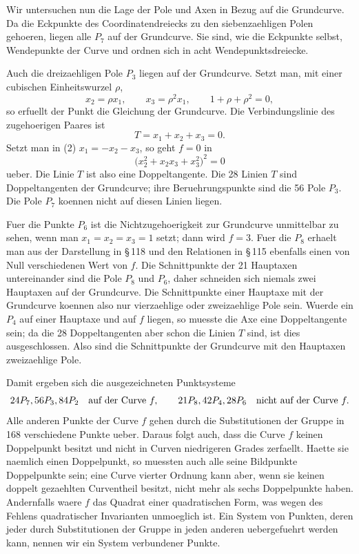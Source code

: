 \documentclass[11pt]{article}
\begin{document}
Wir untersuchen nun die Lage der Pole und Axen in Bezug auf die Grundcurve. Da die Eckpunkte des Coordinatendreiecks zu den siebenzaehligen Polen gehoeren, liegen alle \(P_7\) auf der Grundcurve. Sie sind, wie die Eckpunkte selbst, Wendepunkte der Curve und ordnen sich in acht Wendepunktsdreiecke.

Auch die dreizaehligen Pole \(P_3\) liegen auf der Grundcurve. Setzt man, mit einer cubischen Einheitswurzel \(\rho\),
\begin{equation}
x_2=\rho x_1,
\qquad
x_3=\rho^2x_1,
\qquad
1+\rho+\rho^2=0,
\end{equation}
so erfuellt der Punkt die Gleichung der Grundcurve. Die Verbindungslinie des zugehoerigen Paares ist
\begin{equation}
T=x_1+x_2+x_3=0.
\end{equation}
Setzt man in (2) \(x_1=-x_2-x_3\), so geht \(f=0\) in
\begin{equation}
\bigl(x_2^2+x_2x_3+x_3^2\bigr)^2=0
\end{equation}
ueber. Die Linie \(T\) ist also eine Doppeltangente. Die 28 Linien \(T\) sind Doppeltangenten der Grundcurve; ihre Beruehrungspunkte sind die 56 Pole \(P_3\). Die Pole \(P_7\) koennen nicht auf diesen Linien liegen.

Fuer die Punkte \(P_6\) ist die Nichtzugehoerigkeit zur Grundcurve unmittelbar zu sehen, wenn man \(x_1=x_2=x_3=1\) setzt; dann wird \(f=3\). Fuer die \(P_8\) erhaelt man aus der Darstellung in \S\,118 und den Relationen in \S\,115 ebenfalls einen von Null verschiedenen Wert von \(f\). Die Schnittpunkte der 21 Hauptaxen untereinander sind die Pole \(P_8\) und \(P_6\), daher schneiden sich niemals zwei Hauptaxen auf der Grundcurve. Die Schnittpunkte einer Hauptaxe mit der Grundcurve koennen also nur vierzaehlige oder zweizaehlige Pole sein. Wuerde ein \(P_4\) auf einer Hauptaxe und auf \(f\) liegen, so muesste die Axe eine Doppeltangente sein; da die 28 Doppeltangenten aber schon die Linien \(T\) sind, ist dies ausgeschlossen. Also sind die Schnittpunkte der Grundcurve mit den Hauptaxen zweizaehlige Pole.

Damit ergeben sich die ausgezeichneten Punktsysteme
\begin{equation}
24P_7,\\ 56P_3,\\ 84P_2\quad\text{auf der Curve }f,
\qquad
21P_8,\\42P_4,\\28P_6\quad\text{nicht auf der Curve }f.
\end{equation}
Alle anderen Punkte der Curve \(f\) gehen durch die Substitutionen der Gruppe in 168 verschiedene Punkte ueber. Daraus folgt auch, dass die Curve \(f\) keinen Doppelpunkt besitzt und nicht in Curven niedrigeren Grades zerfaellt. Haette sie naemlich einen Doppelpunkt, so muessten auch alle seine Bildpunkte Doppelpunkte sein; eine Curve vierter Ordnung kann aber, wenn sie keinen doppelt gezaehlten Curventheil besitzt, nicht mehr als sechs Doppelpunkte haben. Andernfalls waere \(f\) das Quadrat einer quadratischen Form, was wegen des Fehlens quadratischer Invarianten unmoeglich ist. Ein System von Punkten, deren jeder durch Substitutionen der Gruppe in jeden anderen uebergefuehrt werden kann, nennen wir ein System verbundener Punkte.
\end{document}
